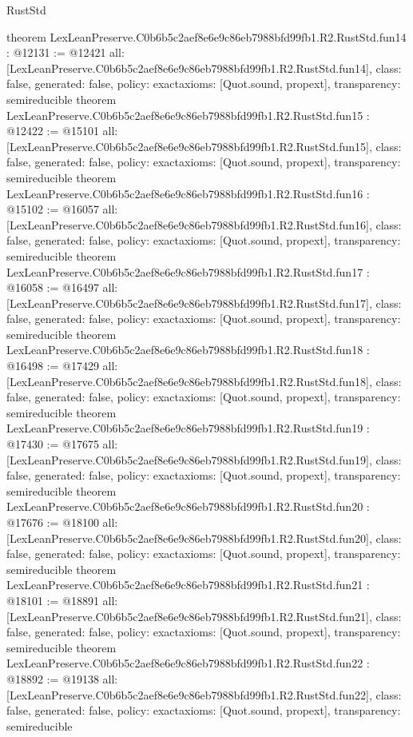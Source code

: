 \begin{lexlean}{RustStd}
\begin{coremodule}
{}
theorem LexLeanPreserve.C0b6b5c2aef8e6e9c86eb7988bfd99fb1.R2.RustStd.fun14 : @12131 := @12421 {
  all: [LexLeanPreserve.C0b6b5c2aef8e6e9c86eb7988bfd99fb1.R2.RustStd.fun14],
  class: false,
  generated: false,
  policy: exact{axioms: [Quot.sound, propext]},
  transparency: semireducible
}
theorem LexLeanPreserve.C0b6b5c2aef8e6e9c86eb7988bfd99fb1.R2.RustStd.fun15 : @12422 := @15101 {
  all: [LexLeanPreserve.C0b6b5c2aef8e6e9c86eb7988bfd99fb1.R2.RustStd.fun15],
  class: false,
  generated: false,
  policy: exact{axioms: [Quot.sound, propext]},
  transparency: semireducible
}
theorem LexLeanPreserve.C0b6b5c2aef8e6e9c86eb7988bfd99fb1.R2.RustStd.fun16 : @15102 := @16057 {
  all: [LexLeanPreserve.C0b6b5c2aef8e6e9c86eb7988bfd99fb1.R2.RustStd.fun16],
  class: false,
  generated: false,
  policy: exact{axioms: [Quot.sound, propext]},
  transparency: semireducible
}
theorem LexLeanPreserve.C0b6b5c2aef8e6e9c86eb7988bfd99fb1.R2.RustStd.fun17 : @16058 := @16497 {
  all: [LexLeanPreserve.C0b6b5c2aef8e6e9c86eb7988bfd99fb1.R2.RustStd.fun17],
  class: false,
  generated: false,
  policy: exact{axioms: [Quot.sound, propext]},
  transparency: semireducible
}
theorem LexLeanPreserve.C0b6b5c2aef8e6e9c86eb7988bfd99fb1.R2.RustStd.fun18 : @16498 := @17429 {
  all: [LexLeanPreserve.C0b6b5c2aef8e6e9c86eb7988bfd99fb1.R2.RustStd.fun18],
  class: false,
  generated: false,
  policy: exact{axioms: [Quot.sound, propext]},
  transparency: semireducible
}
theorem LexLeanPreserve.C0b6b5c2aef8e6e9c86eb7988bfd99fb1.R2.RustStd.fun19 : @17430 := @17675 {
  all: [LexLeanPreserve.C0b6b5c2aef8e6e9c86eb7988bfd99fb1.R2.RustStd.fun19],
  class: false,
  generated: false,
  policy: exact{axioms: [Quot.sound, propext]},
  transparency: semireducible
}
theorem LexLeanPreserve.C0b6b5c2aef8e6e9c86eb7988bfd99fb1.R2.RustStd.fun20 : @17676 := @18100 {
  all: [LexLeanPreserve.C0b6b5c2aef8e6e9c86eb7988bfd99fb1.R2.RustStd.fun20],
  class: false,
  generated: false,
  policy: exact{axioms: [Quot.sound, propext]},
  transparency: semireducible
}
theorem LexLeanPreserve.C0b6b5c2aef8e6e9c86eb7988bfd99fb1.R2.RustStd.fun21 : @18101 := @18891 {
  all: [LexLeanPreserve.C0b6b5c2aef8e6e9c86eb7988bfd99fb1.R2.RustStd.fun21],
  class: false,
  generated: false,
  policy: exact{axioms: [Quot.sound, propext]},
  transparency: semireducible
}
theorem LexLeanPreserve.C0b6b5c2aef8e6e9c86eb7988bfd99fb1.R2.RustStd.fun22 : @18892 := @19138 {
  all: [LexLeanPreserve.C0b6b5c2aef8e6e9c86eb7988bfd99fb1.R2.RustStd.fun22],
  class: false,
  generated: false,
  policy: exact{axioms: [Quot.sound, propext]},
  transparency: semireducible
}
\end{coremodule}
\end{lexlean}
